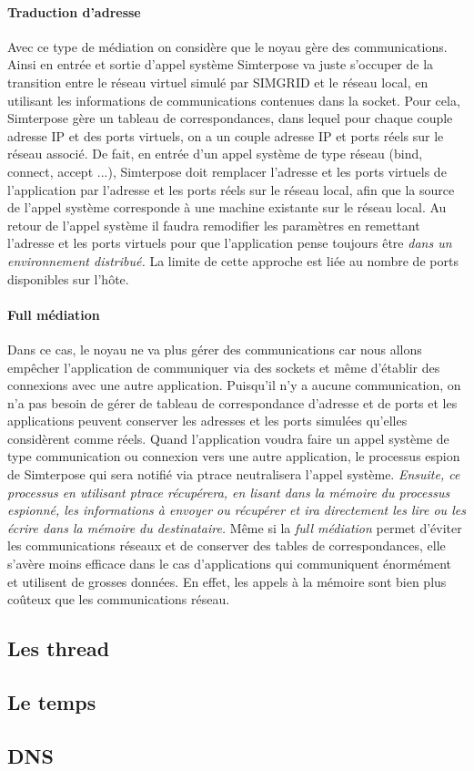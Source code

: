 \paragraph{Traduction d'adresse}
 Avec ce type de médiation on considère que le noyau gère des
 communications. Ainsi en entrée et sortie d'appel système Simterpose va juste
 s'occuper de la transition entre le réseau virtuel simulé par SIMGRID et le
 réseau local, en utilisant les informations de communications contenues dans la
 socket. Pour cela, Simterpose gère un tableau de correspondances, dans lequel
 pour chaque couple adresse IP et des ports virtuels, on a un couple adresse IP
 et ports réels sur le réseau associé.  De fait, en entrée d'un appel système de
 type réseau (bind, connect, accept ...), Simterpose doit remplacer l'adresse et
 les ports virtuels de l'application par l'adresse et les ports réels sur le
 réseau local, afin que la source de l'appel système corresponde à une machine
 existante sur le réseau local. Au retour de l'appel système il faudra
 remodifier les paramètres en remettant l'adresse et les ports virtuels pour que
 l'application pense toujours être \textit{dans un environnement distribué.}  La
 limite de cette approche est liée au nombre de ports disponibles sur l'hôte.

\paragraph{Full médiation} 
Dans ce cas, le noyau ne va plus gérer des communications car nous allons
empêcher l'application de communiquer via des sockets et même d'établir des
connexions avec une autre application.  Puisqu'il n'y a aucune communication, on
n'a pas besoin de gérer de tableau de correspondance d'adresse et de ports et
les applications peuvent conserver les adresses et les ports simulées qu'elles
considèrent comme réels. Quand l'application voudra faire un appel système de
type communication ou connexion vers une autre application, le processus espion
de Simterpose qui sera notifié via ptrace neutralisera l'appel
système. \textit{Ensuite, ce processus en utilisant ptrace récupérera, en lisant
  dans la mémoire du processus espionné, les informations à envoyer ou récupérer
  et ira directement les lire ou les écrire dans la mémoire du destinataire.}
Même si la \textit{full médiation} permet d'éviter les communications réseaux et
de conserver des tables de correspondances, elle s'avère moins efficace
  dans le cas d'applications qui communiquent énormément et utilisent de grosses
  données. En effet, les appels à la mémoire sont bien plus coûteux que les
communications réseau.

\subsection{Les thread}

\subsection{Le temps}

\subsection{DNS}
